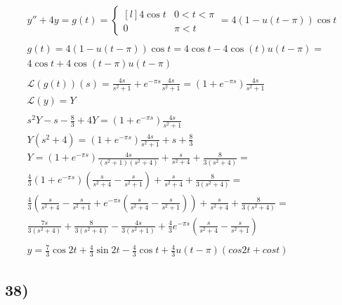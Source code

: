 \documentclass{article}
\newcommand{\paranth}[1]{\left( #1 \right)}
\newcommand{\laplace}[1]{\mathcal{L}\paranth{#1}}
\begin{document}
\begin{gather*}
	y'' + 4y =
	g(t) =
	\left\{\begin{matrix*}[l]
		4 \cos{t}	& 0 < t < \pi \\
		0			& \pi < t
	\end{matrix*}\right. =
	4 \paranth{1 - u(t - \pi)} \cos{t} \\ \\
	g(t) = 4 \paranth{1 - u(t - \pi)} \cos{t} =
	4 \cos{t} - 4 \cos{(t)} u(t - \pi) = \\
	4 \cos{t} + 4 \cos{(t - \pi)} u(t - \pi) \\ \\
	\laplace{g(t)}(s) = \frac{4 s}{s^2 + 1} + e^{-\pi s} \frac{4 s}{s^2 + 1} =
	\paranth{1 + e^{-\pi s}} \frac{4 s}{s^2 + 1} \\
	\laplace{y} = Y \\ \\
	s^2 Y - s - \frac{8}{3} + 4 Y = \paranth{1 + e^{-\pi s}} \frac{4 s}{s^2 + 1} \\
	Y \paranth{s^2 + 4} = \paranth{1 + e^{-\pi s}} \frac{4 s}{s^2 + 1} + s + \frac{8}{3} \\
	Y = \paranth{1 + e^{-\pi s}} \frac{4 s}{\paranth{s^2 + 1} \paranth{s^2 + 4}} +
	\frac{s}{s^2 + 4} + \frac{8}{3 \paranth{s^2 + 4}} = \\
	\frac{4}{3} \paranth{1 + e^{- \pi s}} \paranth{\frac{s}{s^2 + 4} - \frac{s}{s^2 + 1}} +
	\frac{s}{s^2 + 4} + \frac{8}{3 \paranth{s^2 + 4}} = \\
	\frac{4}{3} \paranth{\frac{s}{s^2 + 4} - \frac{s}{s^2 + 1} +
	e^{- \pi s} \paranth{\frac{s}{s^2 + 4} - \frac{s}{s^2 + 1}}} +
	\frac{s}{s^2 + 4} + \frac{8}{3 \paranth{s^2 + 4}} = \\
	\frac{7 s}{3 \paranth{s^2 + 4}} + \frac{8}{3 \paranth{s^2 + 4}} -
	\frac{4 s}{3 \paranth{s^2 + 1}} +
	\frac{4}{3} e^{- \pi s} \paranth{\frac{s}{s^2 + 4} - \frac{s}{s^2 + 1}} \\ \\
	y = \frac{7}{3} \cos{2 t} + \frac{4}{3} \sin{2 t} - \frac{4}{3} \cos{t} +
	\frac{4}{3} u(t - \pi) \paranth{cos{2t} + cos{t}}
\end{gather*}

\newpage


\subsection*{38)}
\end{document}
